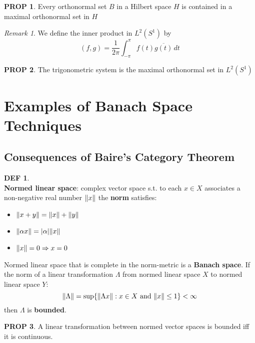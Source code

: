 \documentclass[hidelinks,10pt]{article}
\theoremstyle{definition}
\newtheorem*{defin}{DEF}
\theoremstyle{dotles}
\newenvironment{exercise}[1]
  {\renewcommand\theinnercustomex{#1}\innercustomex}
  {\endinnercustomex}
\theoremstyle{dotless}
\newtheorem{proposition}{PROP}[section]
\theoremstyle{remark}
\newtheorem*{remark}{Remark}
\begin{document}
\begin{proposition}
Every orthonormal set $B$ in a Hilbert space $H$ is contained in a maximal orthonormal set in $H$
\end{proposition}

\begin{remark}
We define the inner product in $L^2(S^1)$ by
\[(f,g)=\frac{1}{2\pi}\int_{-\pi}^\pi f(t)\overline{g(t)}\,dt\]
\end{remark}

\begin{proposition}
The trigonometric system is the maximal orthonormal set in $L^2(S^1)$
\end{proposition}

\begin{exercise}

\end{exercise}

\newpage

\section{Examples of Banach Space Techniques}

\subsection{Consequences of Baire's Category Theorem}

\begin{defin}~\\
\textbf{Normed linear space}: complex vector space s.t. to each $x\in X$ associates a non-negative real number $\norm{x}$ the \textbf{norm} satisfies:\begin{itemize}
    \item $\norm{x+y}=\norm{x}+\norm{y}$
    \item $\norm{\alpha x}=\abs{\alpha}\norm{x}$
    \item $\norm{x}=0\Rightarrow x=0$
\end{itemize}
Normed linear space that is complete in the norm-metric is a \textbf{Banach space}.\bigbreak
If the norm of a linear transformation $\Lambda$ from normed linear space $X$ to normed linear space $Y$:
\[\norm{\Lambda}=\sup\{\norm{\Lambda x}:x\in X\textrm{ and }\norm{x}\leq1\}<\infty\]
then $\Lambda$ is \textbf{bounded}.
\end{defin}

\begin{proposition}
A linear transformation between normed vector spaces is bounded iff it is continuous.
\end{proposition}
\end{document}
